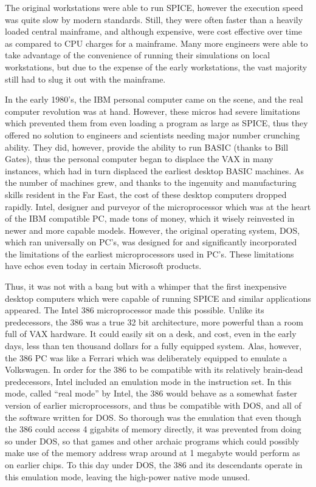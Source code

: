 The original workstations were able to run SPICE, however the
execution speed was quite slow by modern standards.  Still, they were
often faster than a heavily loaded central mainframe, and although
expensive, were cost effective over time as compared to CPU charges
for a mainframe.  Many more engineers were able to take advantage of
the convenience of running their simulations on local workstations,
but due to the expense of the early workstations, the vast majority
still had to slug it out with the mainframe.

In the early 1980's, the IBM personal computer came on the scene, and
the real computer revolution was at hand.  However, these micros had
severe limitations which prevented them from even loading a program as
large as SPICE, thus they offered no solution to engineers and
scientists needing major number crunching ability.  They did, however,
provide the ability to run BASIC (thanks to Bill Gates), thus the
personal computer began to displace the VAX in many instances, which
had in turn displaced the earliest desktop BASIC machines.  As the
number of machines grew, and thanks to the ingenuity and manufacturing
skills resident in the Far East, the cost of these desktop computers
dropped rapidly.  Intel, designer and purveyor of the microprocessor
which was at the heart of the IBM compatible PC, made tons of money,
which it wisely reinvested in newer and more capable models.  However,
the original operating system, DOS, which ran universally on PC's, was
designed for and significantly incorporated the limitations of the
earliest microprocessors used in PC's.  These limitations have echos
even today in certain Microsoft products.

Thus, it was not with a bang but with a whimper that the first
inexpensive desktop computers which were capable of running SPICE and
similar applications appeared.  The Intel 386 microprocessor made this
possible.  Unlike its predecessors, the 386 was a true 32 bit
architecture, more powerful than a room full of VAX hardware.  It
could easily sit on a desk, and cost, even in the early days, less
than ten thousand dollars for a fully equipped system.  Alas, however,
the 386 PC was like a Ferrari which was deliberately equipped to
emulate a Volkswagen.  In order for the 386 to be compatible with its
relatively brain-dead predecessors, Intel included an emulation mode
in the instruction set.  In this mode, called ``real mode'' by Intel,
the 386 would behave as a somewhat faster version of earlier
microprocessors, and thus be compatible with DOS, and all of the
software written for DOS.  So thorough was the emulation that even
though the 386 could access 4 gigabits of memory directly, it was
prevented from doing so under DOS, so that games and other archaic
programs which could possibly make use of the memory address wrap
around at 1 megabyte would perform as on earlier chips.  To this day
under DOS, the 386 and its descendants operate in this emulation mode,
leaving the high-power native mode unused.

